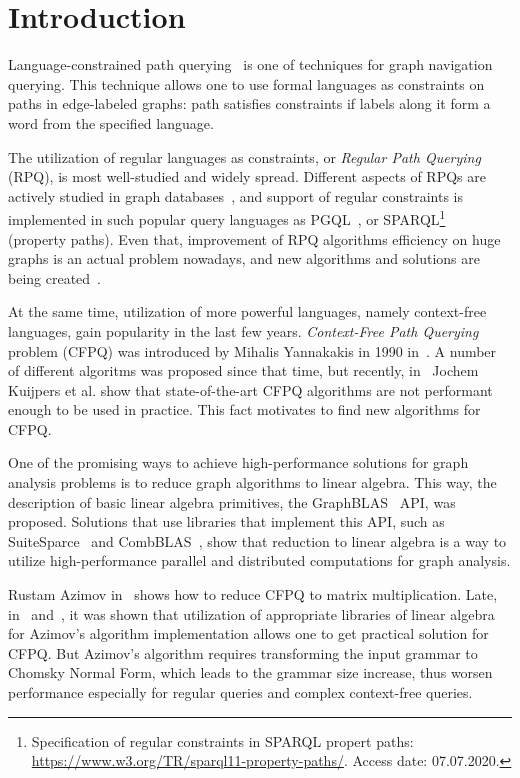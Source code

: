 \section{Introduction}


Language-constrained path querying~\cite{barrett2000formal} is one of techniques for graph navigation querying.
This technique allows one to use formal languages as constraints on paths in edge-labeled graphs: path satisfies constraints if labels along it form a word from the specified language.

The utilization of regular languages as constraints, or \textit{Regular Path Querying} (RPQ), is most well-studied and widely spread.
Different aspects of RPQs are actively studied in graph databases~\cite{10.1145/2463664.2465216, 10.1145/3104031,10.1145/2850413}, and support of regular constraints is implemented in such popular query languages as PGQL~\cite{10.1145/2960414.2960421}, or SPARQL\footnote{Specification of regular constraints in SPARQL propert paths: \url{https://www.w3.org/TR/sparql11-property-paths/}. Access date: 07.07.2020.}~\cite{10.1007/978-3-319-25007-6_1} (property paths).
Even that, improvement of RPQ algorithms efficiency on huge graphs is an actual problem nowadays, and new algorithms and solutions are being created~\cite{Wang2019,10.1145/2949689.2949711}.

At the same time, utilization of more powerful languages, namely context-free languages, gain popularity in the last few years. 
\textit{Context-Free Path Querying} problem (CFPQ) was introduced by Mihalis Yannakakis in 1990 in~\cite{Yannakakis}.
A number of different algoritms was proposed since that time, but recently, in~\cite{Kuijpers:2019:ESC:3335783.3335791} Jochem Kuijpers et al. show that state-of-the-art CFPQ algorithms are not performant enough to be used in practice.
This fact motivates to find new algorithms for CFPQ.

One of the promising ways to achieve high-performance solutions for graph analysis problems is to reduce graph algorithms to linear algebra.
This way, the description of basic linear algebra primitives, the GraphBLAS~\cite{7761646} API, was proposed.
Solutions that use libraries that implement this API, such as SuiteSparce~\cite{10.1145/3322125} and CombBLAS~\cite{10.1177/1094342011403516}, show that reduction to linear algebra is a way to utilize high-performance parallel and distributed computations for graph analysis.

Rustam Azimov in~\cite{Azimov:2018:CPQ:3210259.3210264} shows how to reduce CFPQ to matrix multiplication.
Late, in~\cite{Mishin:2019:ECP:3327964.3328503} and~\cite{10.1145/3398682.3399163}, it was shown that utilization of appropriate libraries of linear algebra for Azimov's algorithm implementation allows one to get practical solution for CFPQ.
But Azimov's algorithm requires transforming the input grammar to Chomsky Normal Form, which leads to the grammar size increase, thus worsen performance especially for regular queries and complex context-free queries.

